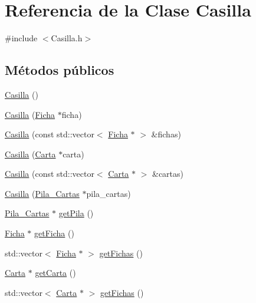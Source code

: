 \hypertarget{class_casilla}{\section{Referencia de la Clase Casilla}
\label{class_casilla}
}


{\ttfamily \#include $<$Casilla.\-h$>$}

\subsection*{Métodos públicos}
\begin{DoxyCompactItemize}
\item 
\hyperlink{class_casilla_a3845e29668cd4299582334c29f3e28a8}{Casilla} ()
\item 
\hyperlink{class_casilla_a847fa14a8dc5dcd0e3ff86ebc9b1b79f}{Casilla} (\hyperlink{class_ficha}{Ficha} $\ast$ficha)
\item 
\hyperlink{class_casilla_a6cbf4fc2d7c9560f46ed16b38ab8173e}{Casilla} (const std\-::vector$<$ \hyperlink{class_ficha}{Ficha} $\ast$ $>$ \&fichas)
\item 
\hyperlink{class_casilla_a6d9aeb92e24c306549ee182c17cf223e}{Casilla} (\hyperlink{class_carta}{Carta} $\ast$carta)
\item 
\hyperlink{class_casilla_a4d58afccf368fd834ca154f7f7d7f67c}{Casilla} (const std\-::vector$<$ \hyperlink{class_carta}{Carta} $\ast$ $>$ \&cartas)
\item 
\hyperlink{class_casilla_a4d9cb4b43ced6a84d49769a97534f9a7}{Casilla} (\hyperlink{class_pila___cartas}{Pila\-\_\-\-Cartas} $\ast$pila\-\_\-cartas)
\item 
\hyperlink{class_pila___cartas}{Pila\-\_\-\-Cartas} $\ast$ \hyperlink{class_casilla_a046f035f5f12d5fc652f916d7a2acb4b}{get\-Pila} ()
\item 
\hyperlink{class_ficha}{Ficha} $\ast$ \hyperlink{class_casilla_ab8821c75d4f7e352c435edd3b5c51112}{get\-Ficha} ()
\item 
std\-::vector$<$ \hyperlink{class_ficha}{Ficha} $\ast$ $>$ \hyperlink{class_casilla_a89bc90caf0ae278226bdbc3de6110f29}{get\-Fichas} ()
\item 
\hyperlink{class_carta}{Carta} $\ast$ \hyperlink{class_casilla_a352ae7e54308b3a1996cf624f167a7c7}{get\-Carta} ()
\item 
std\-::vector$<$ \hyperlink{class_carta}{Carta} $\ast$ $>$ \hyperlink{class_casilla_a52f25991e9fe7e045ec31a8270fdcd8b}{get\-Fichas} ()
\end{DoxyCompactItemize}
